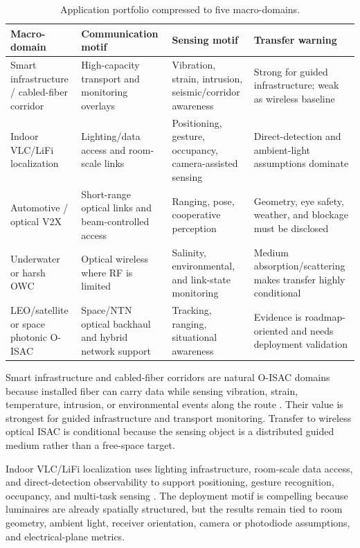 \documentclass[letterpaper,journal]{IEEEtran}
\begin{document}
\begin{table}[!t]
    \caption{Application portfolio compressed to five macro-domains.}
    \label{tab:section7_portfolio}
    \centering
    \scriptsize
    \setlength{\tabcolsep}{2.8pt}
    \renewcommand{\arraystretch}{1.08}
    \begin{tabularx}{\textwidth}{@{}L{2.35cm}L{2.6cm}L{2.55cm}Y@{}}
        \toprule
        Macro-domain & Communication motif & Sensing motif & Transfer warning \\
        \midrule
        Smart infrastructure / cabled-fiber corridor & High-capacity transport and monitoring overlays & Vibration, strain, intrusion, seismic/corridor awareness & Strong for guided infrastructure; weak as wireless baseline \\
        Indoor VLC/LiFi localization & Lighting/data access and room-scale links & Positioning, gesture, occupancy, camera-assisted sensing & Direct-detection and ambient-light assumptions dominate \\
        Automotive / optical V2X & Short-range optical links and beam-controlled access & Ranging, pose, cooperative perception & Geometry, eye safety, weather, and blockage must be disclosed \\
        Underwater or harsh OWC & Optical wireless where RF is limited & Salinity, environmental, and link-state monitoring & Medium absorption/scattering makes transfer highly conditional \\
        LEO/satellite or space photonic O-ISAC & Space/NTN optical backhaul and hybrid network support & Tracking, ranging, situational awareness & Evidence is roadmap-oriented and needs deployment validation \\
        \bottomrule
    \end{tabularx}
\end{table}

Smart infrastructure and cabled-fiber corridors are natural O-ISAC domains because installed fiber can carry data while sensing vibration, strain, temperature, intrusion, or environmental events along the route \cite{O_ISAC_013,O_ISAC_020,O_ISAC_038,O_ISAC_064,O_ISAC_069,O_ISAC_074}. Their value is strongest for guided infrastructure and transport monitoring. Transfer to wireless optical ISAC is conditional because the sensing object is a distributed guided medium rather than a free-space target.

Indoor VLC/LiFi localization uses lighting infrastructure, room-scale data access, and direct-detection observability to support positioning, gesture recognition, occupancy, and multi-task sensing \cite{O_ISAC_009,O_ISAC_011,O_ISAC_022,O_ISAC_030,O_ISAC_039,O_ISAC_050,O_ISAC_054,O_ISAC_060}. The deployment motif is compelling because luminaires are already spatially structured, but the results remain tied to room geometry, ambient light, receiver orientation, camera or photodiode assumptions, and electrical-plane metrics.
\end{document}
